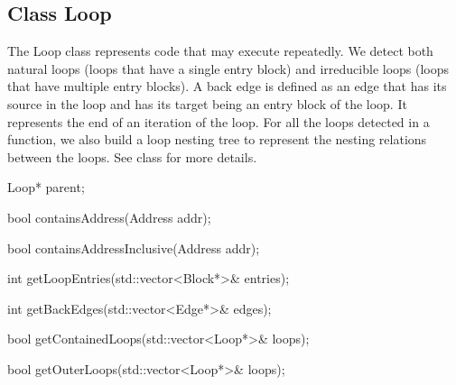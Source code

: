 \subsection{Class Loop}


The Loop class represents code that may execute repeatedly.
We detect both natural loops (loops that have a single entry block)
and irreducible loops (loops that have multiple entry blocks).
A back edge is defined as an edge that has its source in
the loop and has its target being an entry block of the loop.
It represents the end of an iteration of the loop.
For all the loops detected in a function, we also build a loop nesting
tree to represent the nesting relations between the loops.
See class  for more details.

\begin{apient}
Loop* parent;
\end{apient}


\begin{apient}
bool containsAddress(Address addr);
\end{apient}


\begin{apient}
bool containsAddressInclusive(Address addr);
\end{apient}

\begin{apient}
int getLoopEntries(std::vector<Block*>& entries);
\end{apient}


\begin{apient}
int getBackEdges(std::vector<Edge*>& edges);
\end{apient}

\begin{apient}
bool getContainedLoops(std::vector<Loop*>& loops);
\end{apient}

\begin{apient}
bool getOuterLoops(std::vector<Loop*>& loops);
\end{apient}


